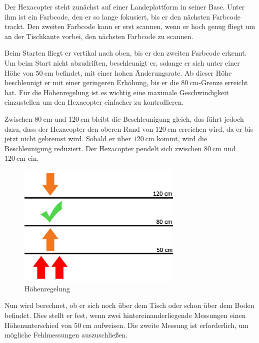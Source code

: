    Der Hexacopter steht zunächst auf einer Landeplattform in seiner Base. Unter ihm ist ein Farbcode, den er so lange fokusiert, bis er den nächsten Farbcode trackt. Den zweiten Farbcode kann er erst scannen, wenn er hoch genug fliegt um an der Tischkante vorbei, den nächsten Farbcode zu scannen.

    Beim Starten fliegt er vertikal nach oben, bis er den zweiten Farbcode erkennt. Um beim Start nicht abzudriften, beschleunigt er, solange er sich unter einer Höhe von $\SI{50}{\centi\metre}$ befindet, mit einer hohen Änderungsrate. Ab dieser Höhe beschleunigt er mit einer geringeren Erhöhung, bis er die $\SI{80}{\centi\metre}$-Grenze erreicht hat. Für die Höhenregelung ist es wichtig eine maximale Geschwindigkeit einzustellen um den Hexacopter einfacher zu kontrollieren. 
    
    Zwischen $\SI{80}{\centi\metre}$ und $\SI{120}{\centi\metre}$ bleibt die Beschleunigung gleich, das führt jedoch dazu, dass der Hexacopter den oberen Rand von $\SI{120}{\centi\metre}$ erreichen wird, da er bis jetzt nicht gebremst wird. Sobald er über $\SI{120}{\centi\metre}$ kommt, wird die Beschleunigung reduziert. Der Hexacopter pendelt sich zwischen $\SI{80}{\centi\metre}$ und $\SI{120}{\centi\metre}$ ein.

    \begin{figure}[H]
      \begin{centering}
        \includegraphics[width = 0.7\textwidth]{Bilder/bor_hoehenregelung}
      \par\end{centering}
      \caption{Höhenregelung}
      \label{Throttle}
    \end{figure}

    Nun wird berechnet, ob er sich noch über dem Tisch oder schon über dem Boden befindet. Dies stellt er fest, wenn zwei hintereinanderliegende Messungen einen Höhenunterschied von $\SI{50}{\centi\metre}$ aufweisen. Die zweite Messung ist erforderlich, um mögliche Fehlmessungen auszuschließen.

